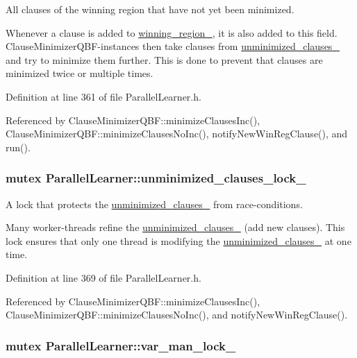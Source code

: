 All clauses of the winning region that have not yet been minimized. 

Whenever a clause is added to \hyperlink{classParallelLearner_a7c8383543ff98d7a0356a237756dcdd6}{winning\-\_\-region\-\_\-}, it is also added to this field. Clause\-Minimizer\-Q\-B\-F-\/instances then take clauses from \hyperlink{classParallelLearner_aba6b363071d9a39d7b368cec5b629c25}{unminimized\-\_\-clauses\-\_\-} and try to minimize them further. This is done to prevent that clauses are minimized twice or multiple times. 

Definition at line 361 of file Parallel\-Learner.\-h.



Referenced by Clause\-Minimizer\-Q\-B\-F\-::minimize\-Clauses\-Inc(), Clause\-Minimizer\-Q\-B\-F\-::minimize\-Clauses\-No\-Inc(), notify\-New\-Win\-Reg\-Clause(), and run().

\hypertarget{classParallelLearner_aa16d364d9fdd0c2fe5180ee1b023a4ec}{
\subsubsection[{unminimized\-\_\-clauses\-\_\-lock\-\_\-}]{\setlength{\rightskip}{0pt plus 5cm}mutex Parallel\-Learner\-::unminimized\-\_\-clauses\-\_\-lock\-\_\-}}\label{classParallelLearner_aa16d364d9fdd0c2fe5180ee1b023a4ec}


A lock that protects the \hyperlink{classParallelLearner_aba6b363071d9a39d7b368cec5b629c25}{unminimized\-\_\-clauses\-\_\-} from race-\/conditions. 

Many worker-\/threads refine the \hyperlink{classParallelLearner_aba6b363071d9a39d7b368cec5b629c25}{unminimized\-\_\-clauses\-\_\-} (add new clauses). This lock ensures that only one thread is modifying the \hyperlink{classParallelLearner_aba6b363071d9a39d7b368cec5b629c25}{unminimized\-\_\-clauses\-\_\-} at one time. 

Definition at line 369 of file Parallel\-Learner.\-h.



Referenced by Clause\-Minimizer\-Q\-B\-F\-::minimize\-Clauses\-Inc(), Clause\-Minimizer\-Q\-B\-F\-::minimize\-Clauses\-No\-Inc(), and notify\-New\-Win\-Reg\-Clause().

\hypertarget{classParallelLearner_abdd409a5ef29bd4ba6b7213e9d4a067b}{
\subsubsection[{var\-\_\-man\-\_\-lock\-\_\-}]{\setlength{\rightskip}{0pt plus 5cm}mutex Parallel\-Learner\-::var\-\_\-man\-\_\-lock\-\_\-}}\label{classParallelLearner_abdd409a5ef29bd4ba6b7213e9d4a067b}


